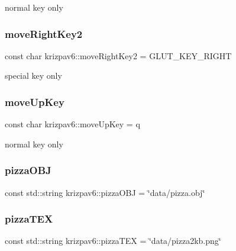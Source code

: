 normal key only 

\mbox{\label{namespacekrizpav6_a3e77a9228006135a04b435c77178af26}} 
\subsubsection{\texorpdfstring{moveRightKey2}{moveRightKey2}}
{\footnotesize\ttfamily const char krizpav6\+::move\+Right\+Key2 = G\+L\+U\+T\+\_\+\+K\+E\+Y\+\_\+\+R\+I\+G\+HT}



special key only 

\mbox{\label{namespacekrizpav6_a3936abec48cb9be3d7ea82b9cac4b4a5}} 
\subsubsection{\texorpdfstring{moveUpKey}{moveUpKey}}
{\footnotesize\ttfamily const char krizpav6\+::move\+Up\+Key = \textquotesingle{}q\textquotesingle{}}



normal key only 

\mbox{\label{namespacekrizpav6_ae82fd1b60a54fc4f52cd6dc4136a1a55}} 
\subsubsection{\texorpdfstring{pizzaOBJ}{pizzaOBJ}}
{\footnotesize\ttfamily const std\+::string krizpav6\+::pizza\+O\+BJ = \char`\"{}data/pizza.\+obj\char`\"{}}

\mbox{\label{namespacekrizpav6_aa8ed1c4d17d6d0e20156f492a95d36dc}} 
\subsubsection{\texorpdfstring{pizzaTEX}{pizzaTEX}}
{\footnotesize\ttfamily const std\+::string krizpav6\+::pizza\+T\+EX = \char`\"{}data/pizza2kb.\+png\char`\"{}}

